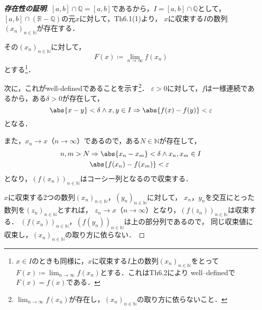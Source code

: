 \begin{tleftbar}
    \begin{proof}[\textup{\textbf{存在性の証明}}]
        $\overline{[a,b] \cap \mathbb{Q}}=[a,b]$であるから，$I=[a,b] \cap \mathbb{Q}$として，
        $[a,b] \cap (\mathbb{R}-\mathbb{Q})$の元$x$に対して，Th6.1(1)より，
        $x$に収束する$I$の数列$(x_n)_{n \in \mathbb{N}}$が存在する．

        その$(x_n)_{n \in \mathbb{N}}$に対して，
        \[
            F(x)\coloneqq \lim_{n \to \infty} f(x_n)
        \]
        とする\footnote{$x \in I$のときも同様に，$x$に収束する$I$上の数列$(x_n)_{n \in \mathbb{N}}$をとって$F(x)\coloneqq \lim_{n \to \infty} f(x_n)$とする．これはTh6.2により well--definedで$F(x)=f(x)$である．}．

        次に，これがwell-definedであることを示す\footnote{$\lim_{n \to \infty} f(x_n)$が存在し，$(x_n)_{n \in \mathbb{N}}$の取り方に依らないこと．}．
        $\varepsilon >0$に対して，$f$は一様連続であるから，ある$\delta >0$が存在して，
        \[
            \abs{x-y}<\delta \land x,y \in I \Rightarrow \abs{f(x)-f(y)}<\varepsilon
        \]
        となる．

        また，$x_n \to x$（$n \to \infty$）であるので，ある$N \in \mathbb{N}$が存在して，
        \begin{align*}
            n, m > N & \Rightarrow \abs{x_n-x_m}<\delta \land x_n,x_m \in I \\
                     & \abs{f(x_n)-f(x_m)}<\varepsilon
        \end{align*}
        となり，$(f(x_n))_{n \in \mathbb{N}}$はコーシー列となるので収束する．

        $x$に収束する2つの数列$(x_n)_{n \in \mathbb{N}}$，$(y_n)_{n \in \mathbb{N}}$に対して，
        $x_n$，$y_n$を交互にとった数列を$(z_n)_{n \in \mathbb{N}}$とすれば，
        $z_n \to x$（$n \to \infty$）となり，$(f(z_n))_{n \in \mathbb{N}}$は収束する．
        $(f(x_n))_{n \in \mathbb{N}}$，$(f(y_n))_{n \in \mathbb{N}}$は上の部分列であるので，
        同じ収束値に収束し，$(x_n)_{n \in \mathbb{N}}$の取り方に依らない．
    \end{proof}
\end{tleftbar}


